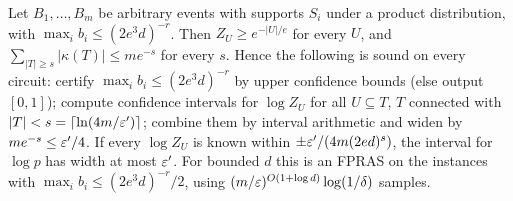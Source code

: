 \begin{proposition}\label{prop:kp}
Let $B_1,\dots,B_m$ be arbitrary events with supports $S_i$ under a product
distribution, with $\max_ib_i\le(2e^3d)^{-r}$. Then $Z_U\ge e^{-|U|/e}$ for every $U$, and
$\sum_{|T|\ge s}|\kappa(T)|\le me^{-s}$ for every $s$. Hence the following is sound on
every circuit: certify $\max_ib_i\le(2e^3d)^{-r}$ by upper confidence bounds (else
output $[0,1]$); compute confidence intervals for $\log Z_U$ for all $U\subseteq T$, $T$
connected with $|T|<s=\lceil\ln(4m/\varepsilon')\rceil$; combine them by interval arithmetic
and widen by $me^{-s}\le\varepsilon'/4$. If every $\log Z_U$ is known within
$\pm\varepsilon'/(4m(2ed)^s)$, the interval for $\log p$ has width at most $\varepsilon'$. For bounded
$d$ this is an FPRAS on the instances with $\max_ib_i\le(2e^3d)^{-r}/2$, using
$(m/\varepsilon)^{O(1+\log d)}\log(1/\delta)$ samples.
\end{proposition}

